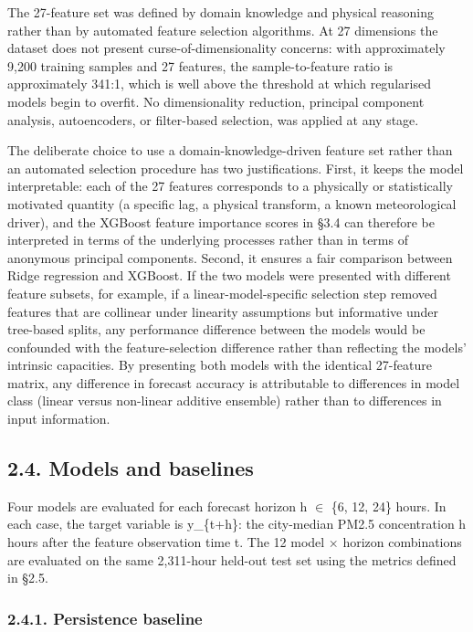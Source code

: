 The 27-feature set was defined by domain knowledge and physical reasoning rather than by automated feature selection algorithms. At 27 dimensions the dataset does not present curse-of-dimensionality concerns: with approximately 9,200 training samples and 27 features, the sample-to-feature ratio is approximately 341:1, which is well above the threshold at which regularised models begin to overfit. No dimensionality reduction, principal component analysis, autoencoders, or filter-based selection, was applied at any stage.

The deliberate choice to use a domain-knowledge-driven feature set rather than an automated selection procedure has two justifications. First, it keeps the model interpretable: each of the 27 features corresponds to a physically or statistically motivated quantity (a specific lag, a physical transform, a known meteorological driver), and the XGBoost feature importance scores in §3.4 can therefore be interpreted in terms of the underlying processes rather than in terms of anonymous principal components. Second, it ensures a fair comparison between Ridge regression and XGBoost. If the two models were presented with different feature subsets, for example, if a linear-model-specific selection step removed features that are collinear under linearity assumptions but informative under tree-based splits, any performance difference between the models would be confounded with the feature-selection difference rather than reflecting the models' intrinsic capacities. By presenting both models with the identical 27-feature matrix, any difference in forecast accuracy is attributable to differences in model class (linear versus non-linear additive ensemble) rather than to differences in input information.

\subsection{2.4. Models and baselines}\label{models-and-baselines}

Four models are evaluated for each forecast horizon h $\in$ \{6, 12, 24\} hours. In each case, the target variable is y\_\{t+h\}: the city-median PM2.5 concentration h hours after the feature observation time t. The 12 model × horizon combinations are evaluated on the same 2,311-hour held-out test set using the metrics defined in §2.5.

\subsubsection{2.4.1. Persistence baseline}\label{persistence-baseline}

